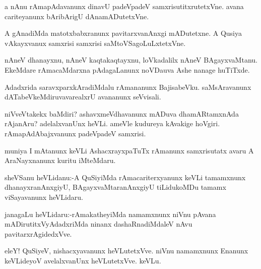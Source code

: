 \documentclass{article}
\begin{document}
\begin{mn}%
a nAnu rAmapAdavanunx dinavU padeVpadeV samxrisutitxrutetxVne. avana cariteyanunx bAribArigU 
dAnamADutetxVne.
\end{mn}

\begin{mn}%
A gAnadiMda matotxbabxranunx pavitarxvanAnxgi mADutetxne. A Qusiya vAkayxvanux samxrisi 
samxrisi saMtoVSagoLuLxtetxVne.
\end{mn}

\begin{mn}%
nAneV dhanayxnu, nAneV kaqtakaqtayxnu, loVkadalilx nAneV BAgayxvaMtanu. EkeMdare 
rAmacaMdarxna pAdagaLanunx noVDauva Ashe nanage huTiTxde.
\end{mn}

\begin{mn}%
Adadxrida saravxparxkAradiMdalu rAmananunx BajisabeVku. saMsAravanunx 
dATabeVkeMdiruvavarealxrU avananunx seVvisali.
\end{mn}

\begin{mn}%
niVveVtakekx baMdiri? ashavxmeVdhavanunx mADuva dhamARtamxnAda rAjanAru? adelalxvanUnx 
heVLi. ameVle kudureya kAvakige hoVgiri. rAmapAdAbajxvanunx padeVpadeV samxrisi.
\end{mn}

\begin{mn}%
muniya I mAtanunx keVLi AshacxrayxpaTuTx rAmanunx samxrisutatx avaru A AraNayxnanunx 
kuritu iMteMdaru.
\end{mn}


\begin{mn}%
sheVSanu heVLidanu:-A QuSiyiMda rAmacariterxyanunx keVLi tamamxnunx dhanayxranAnxgiyU, 
BAgayxvaMtaranAnxgiyU tiLidukoMDu tamamx viSayavanunx heVLidaru.
\end{mn}

\begin{mn}%
janagaLu heVLidaru:-rAmakatheyiMda namamxnunx niVnu pAvana mADirutitxVyAdadxriMda ninanx 
dashaRnadiMdaleV nAvu pavitarxrAgidedxVve.
\end{mn}

\begin{mn}%
eleY! QuSiyeV, nishacxyavanunx heVLutetxVve. niVnu namamxnunx Enanunx keVLideyoV 
avelalxvanUnx heVLutetxVve. keVLu.
\end{mn}
\end{document}
